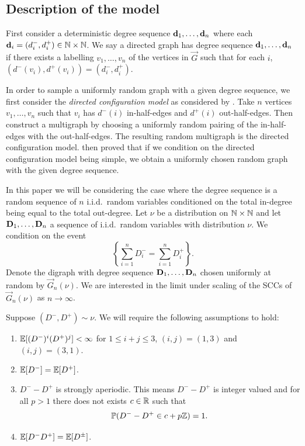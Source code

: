 \subsection{Description of the model}

First consider a deterministic degree sequence ${\mathbf d}_1, \ldots, {\mathbf d}_n$ where each ${\mathbf d}_i = (d_i^-, d_i^+)\in {\mathbb N} \times {\mathbb N}$. We say a directed graph has degree sequence ${\mathbf d}_1, \ldots, {\mathbf d}_n$ if there exists a labelling $v_1, \ldots, v_n$ of the vertices in $\vec{G}$ such that for each $i$, $(d^-(v_i), d^+(v_i)) = (d_i^-, d_i^+)$.

In order to sample a uniformly random graph with a given degree sequence, we first consider the \emph{directed configuration model} as considered by \citet{cooperSizeLargestStrongly2004}. Take $n$ vertices $v_1, \ldots, v_n$ such that $v_i$ has $d^-(i)$ in-half-edges and $d^+(i)$ out-half-edges. Then construct a multigraph by choosing a uniformly random pairing of the in-half-edges with the out-half-edges. The resulting random multigraph is the directed configuration model. \citet{cooperSizeLargestStrongly2004} then proved that if we condition on the directed configuration model being simple, we obtain a uniformly chosen random graph with the given degree sequence.

In this paper we will be considering the case where the degree sequence is a random sequence of $n$ i.i.d.\ random variables conditioned on the total in-degree being equal to the total out-degree. Let $\nu$ be a distribution on ${\mathbb N} \times {\mathbb N}$ and let ${\mathbf D}_1, \ldots, {\mathbf D}_n$ a sequence of i.i.d.\ random variables with distribution $\nu$. We condition on the event
\begin{equation*}
    \left\{ \textstyle \sum_{i=1}^n D_i^- = \sum_{i=1}^n D_i^+ \right\}.
\end{equation*}
Denote the digraph with degree sequence ${\mathbf D}_1, \ldots, {\mathbf D}_n$ chosen uniformly at random by $\vec{G}_n(\nu)$. We are interested in the limit under scaling of the SCCs of $\vec{G}_n(\nu)$ as $n\to \infty$.

Suppose $(D^-, D^+) \sim \nu$. We will require the following assumptions to hold:
\begin{enumerate}
    \item ${\mathbb E}[(D^-)^i(D^+)^j]< \infty$ for $1 \leq i+j\leq 3$, $(i, j) = (1, 3)$ and $(i, j) = (3, 1)$.
    \item ${\mathbb E}[D^-] = {\mathbb E}[D^+]$.
    \item $D^- - D^+$ is strongly aperiodic. This means $D^- - D^+$ is integer valued and for all $p > 1$ there does not exists $c \in {\mathbb R}$ such that 
    \begin{equation*}
        {\mathbb P}(D^- - D^+ \in c + p{\mathbb Z}) = 1.
    \end{equation*}
    \item ${\mathbb E}[D^-D^+] = {\mathbb E}[D^{\pm}]$.
\end{enumerate}

